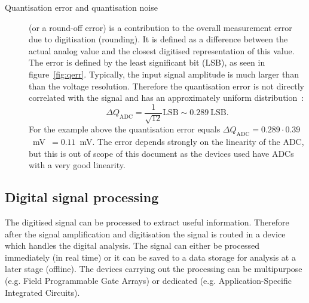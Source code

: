 \begin{description}
\item[Quantisation error and quantisation noise] (or a round-off error) is a contribution to the overall measurement error due to digitisation (rounding). It is defined as a difference between the actual analog value and the closest digitised representation of this value. The error is defined by the least significant bit (LSB), as seen in figure~\ref{fig:qerr}. Typically, the input signal amplitude is much larger than than the voltage resolution. Therefore the quantisation error is not directly correlated with the signal and has an approximately uniform distribution~\cite{}: 
\begin{equation}
\label{eq:qerr}
\Delta Q_\mathrm{ADC}=\frac{1}{\sqrt{12}}\mathrm{LSB}\sim0.289~\mathrm{LSB}.
\end{equation} 
For the example above the quantisation error equals $\Delta Q_\mathrm{ADC}=0.289\cdot 0.39$~mV~$=0.11$~mV. The error depends strongly on the linearity of the ADC, but this is out of scope of this document as the devices used have ADCs with a very good linearity.
\end{description}

\subsection{Digital signal processing}
The digitised signal can be processed to extract useful information. Therefore after the signal amplification and digitisation the signal is routed in a device which handles the digital analysis. The signal can either be processed immediately (in real time) or it can be saved to a data storage for analysis at a later stage (offline). The devices carrying out the processing can be multipurpose (e.g. Field Programmable Gate Arrays) or dedicated (e.g. Application-Specific Integrated Circuits).

